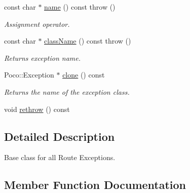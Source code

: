 \begin{DoxyCompactItemize}
\mbox{\label{classecodtn_1_1net_1_1TrafficControlException_a1c4316af3cb782dba3a55724100be377}} 
const char $\ast$ \hyperlink{classecodtn_1_1net_1_1TrafficControlException_a1c4316af3cb782dba3a55724100be377}{name} () const  throw ()
\begin{DoxyCompactList}\small\item\em Assignment operator. \end{DoxyCompactList}\item 
\mbox{\label{classecodtn_1_1net_1_1TrafficControlException_a2d6bc4048216bd75bd54b13a3424fb64}} 
const char $\ast$ \hyperlink{classecodtn_1_1net_1_1TrafficControlException_a2d6bc4048216bd75bd54b13a3424fb64}{class\+Name} () const  throw ()
\begin{DoxyCompactList}\small\item\em Returns exception name. \end{DoxyCompactList}\item 
\mbox{\label{classecodtn_1_1net_1_1TrafficControlException_ac29cb846ab70e8a2050dcc84f186dc68}} 
Poco\+::\+Exception $\ast$ \hyperlink{classecodtn_1_1net_1_1TrafficControlException_ac29cb846ab70e8a2050dcc84f186dc68}{clone} () const
\begin{DoxyCompactList}\small\item\em Returns the name of the exception class. \end{DoxyCompactList}\item 
void \hyperlink{classecodtn_1_1net_1_1TrafficControlException_a6f723aac3630fcd2457ffaa63d622b00}{rethrow} () const
\end{DoxyCompactItemize}


\subsection{Detailed Description}
Base class for all Route Exceptions. 

\subsection{Member Function Documentation}
\mbox{\label{classecodtn_1_1net_1_1TrafficControlException_a6f723aac3630fcd2457ffaa63d622b00}} 
